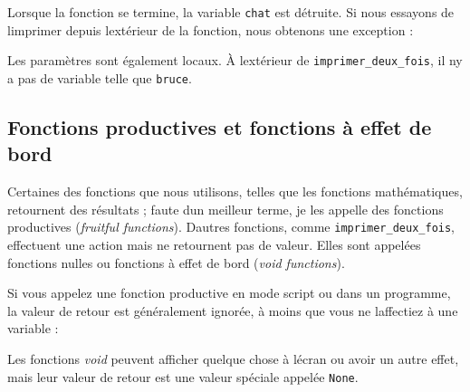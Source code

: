 Lorsque la fonction se termine, la variable \texttt{chat} est détruite.
Si nous essayons de l\textquotesingle imprimer depuis
l\textquotesingle extérieur de la fonction, nous obtenons une exception
:

\begin{Shaded}
\begin{Highlighting}[]
\OperatorTok{\textgreater{}\textgreater{}\textgreater{}} 
  
\end{Highlighting}
\end{Shaded}

Les paramètres sont également locaux. À l\textquotesingle extérieur de
\texttt{imprimer\_deux\_fois}, il n\textquotesingle y a pas de variable
telle que \texttt{bruce}.

\hypertarget{fonctions-productives-et-fonctions-uxe0-effet-de-bord}{%
\subsection{Fonctions productives et fonctions à effet de
bord}\label{fonctions-productives-et-fonctions-uxe0-effet-de-bord}}

Certaines des fonctions que nous utilisons, telles que les fonctions
mathématiques, retournent des résultats ; faute d\textquotesingle un
meilleur terme, je les appelle des fonctions productives (\emph{fruitful
functions}). D\textquotesingle autres fonctions, comme
\texttt{imprimer\_deux\_fois}, effectuent une action mais ne retournent
pas de valeur. Elles sont appelées fonctions nulles ou fonctions à effet
de bord (\emph{void functions}).

Si vous appelez une fonction productive en mode script ou dans un
programme, la valeur de retour est généralement ignorée, à moins que
vous ne l\textquotesingle affectiez à une variable :

\begin{Shaded}
\begin{Highlighting}[]
\OperatorTok{=}
\end{Highlighting}
\end{Shaded}

Les fonctions \emph{void} peuvent afficher quelque chose à
l\textquotesingle écran ou avoir un autre effet, mais leur valeur de
retour est une valeur spéciale appelée \texttt{None}.

